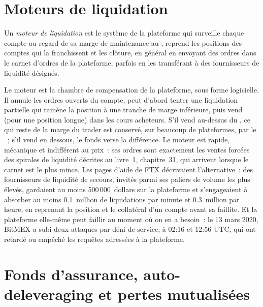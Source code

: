 \section{Moteurs de liquidation}

\begin{definition}\label{def:m3:margin-liquidation-and-loss-allocation:engine}
Un \emph{moteur de liquidation} est le système de la plateforme qui surveille chaque compte au regard de
sa marge de maintenance au , reprend les positions des comptes qui la franchissent et les clôture,
en général en envoyant des ordres dans le carnet d'ordres de la plateforme, parfois en les transférant à des
fournisseurs de liquidité désignés.
\end{definition}

Le moteur est la chambre de compensation de la plateforme, sous forme logicielle. Il annule les ordres ouverts du compte, peut d'abord tenter
une liquidation partielle qui ramène la position à une tranche de marge inférieure, puis vend (pour une position longue) dans les cours acheteurs. S'il vend
au-dessus du , ce qui reste de la marge du trader est conservé, sur beaucoup de plateformes, par le ~;
s'il vend en dessous, le fonds verse la différence. Le moteur est rapide, mécanique et indifférent au prix~: ses ordres
sont exactement les ventes forcées des spirales de liquidité décrites au livre~1, chapitre~31, qui arrivent lorsque le carnet est le plus mince.
Les pages d'aide de FTX décrivaient l'alternative~: des fournisseurs de liquidité de secours, invités parmi ses paliers de volume les plus élevés, gardaient au moins 500\,000~dollars
sur la plateforme et s'engageaient à absorber au moins 0.1~million de liquidations par minute et 0.3~million par heure, en reprenant la position
et le collatéral d'un compte avant sa faillite. Et la plateforme elle-même peut faillir au moment où on en a besoin~: le 13 mars 2020, BitMEX a subi
deux attaques par déni de service, à 02:16 et 12:56 UTC, qui ont retardé ou empêché les requêtes adressées à la plateforme.

\section{Fonds d'assurance, auto-deleveraging et pertes mutualisées}

